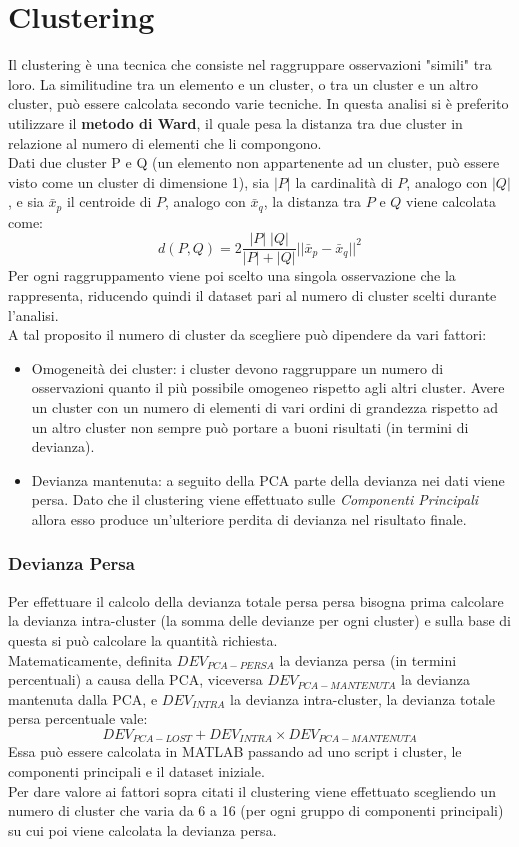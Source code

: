 \section{Clustering}
Il clustering è una tecnica che consiste nel raggruppare osservazioni "simili" tra loro. La similitudine tra un elemento e un cluster, o tra un cluster e un altro cluster, può essere calcolata secondo varie tecniche. In questa analisi si è preferito utilizzare il \textbf{metodo di Ward}, il quale pesa la distanza tra due cluster in relazione al numero di elementi che li compongono.
\\Dati due cluster P e Q (un elemento non appartenente ad un cluster, può essere visto come un cluster di dimensione 1), sia $|P|$ la cardinalità di $P$, analogo con $|Q|$, e sia $\bar{x}_p$ il centroide di $P$, analogo con $\bar{x}_q$, la distanza tra $P$ e $Q$ viene calcolata come:
\begin{equation*}
	d(P,Q) = 2 \dfrac{|P| \; |Q|}{|P| + |Q|} ||\bar{x}_p - \bar{x}_q ||^2
\end{equation*}
Per ogni raggruppamento viene poi scelto una singola osservazione che la rappresenta, riducendo quindi il dataset pari al numero di cluster scelti durante l'analisi.
\\A tal proposito il numero di cluster da scegliere può dipendere da vari fattori:
\begin{itemize}
	\item Omogeneità dei cluster: i cluster devono raggruppare un numero di osservazioni quanto il più possibile omogeneo rispetto agli altri cluster. Avere un cluster con un numero di elementi di vari ordini di grandezza rispetto ad un altro cluster non sempre può portare a buoni risultati (in termini di devianza).
	\item Devianza mantenuta: a seguito della PCA parte della devianza nei dati viene persa. Dato che il clustering viene effettuato sulle \textit{Componenti Principali} allora esso produce un'ulteriore perdita di devianza nel risultato finale.
\end{itemize}
\subsubsection{Devianza Persa}
Per effettuare il calcolo della devianza totale persa persa bisogna prima calcolare la devianza intra-cluster (la somma delle devianze per ogni cluster) e sulla base di questa si può calcolare la quantità richiesta.
\\Matematicamente, definita $DEV_{PCA-PERSA}$ la devianza persa (in termini percentuali) a causa della PCA, viceversa $DEV_{PCA-MANTENUTA}$ la devianza mantenuta dalla PCA, e $DEV_{INTRA}$ la devianza intra-cluster, la devianza totale persa percentuale vale:
\begin{equation*}
	DEV_{PCA-LOST} + DEV_{INTRA}\times DEV_{PCA-MANTENUTA}
\end{equation*}
Essa può essere calcolata in MATLAB passando ad uno script i cluster, le componenti principali e il dataset iniziale.
\\ Per dare valore ai fattori sopra citati il clustering viene effettuato scegliendo un numero di cluster che varia da 6 a 16 (per ogni gruppo di componenti principali) su cui poi viene calcolata la devianza persa.
